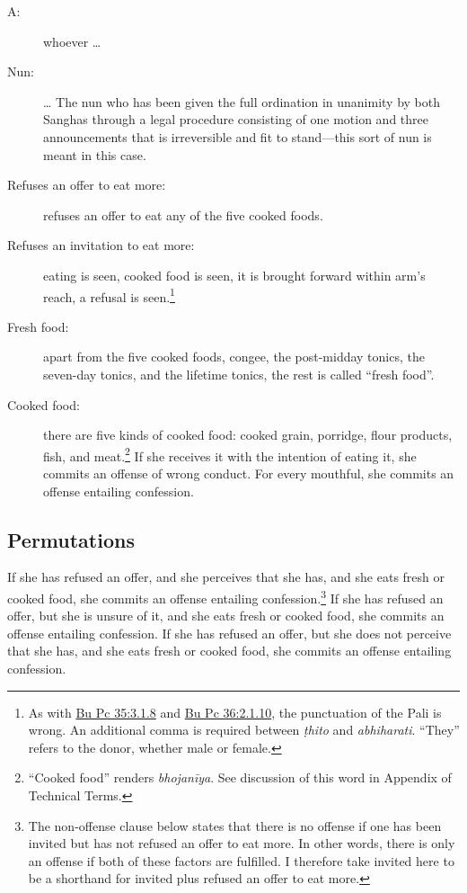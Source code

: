 \documentclass[12pt,openany]{book}%
\begin{document}
\begin{description}%
\item[A: ] whoever … %
\item[Nun: ] … The nun who has been given the full ordination in unanimity by both Sanghas through a legal procedure consisting of one motion and three announcements that is irreversible and fit to stand—this sort of nun is meant in this case. %
\item[Refuses an offer to eat more: ] refuses an offer to eat any of the five cooked foods. %
\item[Refuses an invitation to eat more: ] eating is seen, cooked food is seen, it is brought forward within arm’s reach, a refusal is seen.\footnote{As with \href{https://suttacentral.net/pli-tv-bu-vb-pc35/en/brahmali\#3.1.8}{Bu Pc 35:3.1.8} and \href{https://suttacentral.net/pli-tv-bu-vb-pc36/en/brahmali\#2.1.10}{Bu Pc 36:2.1.10}, the punctuation of the Pali is wrong. An additional comma is required between \textit{\textsanskrit{ṭhito}} and \textit{abhiharati}. “They” refers to the donor, whether male or female. } %
\item[Fresh food: ] apart from the five cooked foods, congee, the post-midday tonics, the seven-day tonics, and the lifetime tonics, the rest is called “fresh food”. %
\item[Cooked food: ] there are five kinds of cooked food: cooked grain, porridge, flour products, fish, and meat.\footnote{“Cooked food” renders \textit{\textsanskrit{bhojanīya}}. See discussion of this word in Appendix of Technical Terms. } If she receives it with the intention of eating it, she commits an offense of wrong conduct. For every mouthful, she commits an offense entailing confession. %
\end{description}

\subsection*{Permutations }

If she has refused an offer, and she perceives that she has, and she eats fresh or cooked food, she commits an offense entailing confession.\footnote{The non-offense clause below states that there is no offense if one has been invited but has not refused an offer to eat more. In other words, there is only an offense if both of these factors are fulfilled. I therefore take invited here to be a shorthand for invited plus refused an offer to eat more. } If she has refused an offer, but she is unsure of it, and she eats fresh or cooked food, she commits an offense entailing confession. If she has refused an offer, but she does not perceive that she has, and she eats fresh or cooked food, she commits an offense entailing confession. 
\end{document}
